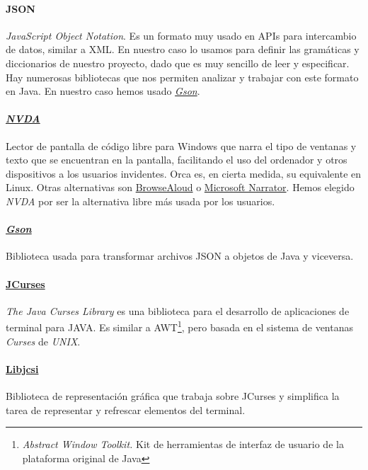 \paragraph{JSON} \textit{JavaScript Object Notation}. Es un formato muy usado en APIs para intercambio de datos, similar a XML. En nuestro caso lo usamos para definir las gramáticas y diccionarios de nuestro proyecto, dado que es muy sencillo de leer y especificar. Hay numerosas bibliotecas que nos permiten analizar y trabajar con este formato en Java. En nuestro caso hemos usado \href{https://goo.gl/zPCXen}{\textit{Gson}}.

\paragraph{\href{www.nvaccess.org}{\textit{NVDA}}} Lector de pantalla de código libre para Windows que narra el tipo de ventanas y texto que se encuentran en la pantalla, facilitando el uso del ordenador y otros dispositivos a los usuarios invidentes. 
Orca es, en cierta medida, su equivalente en Linux. Otras alternativas son \href{https://goo.gl/GoghW7}{BrowseAloud} o \href{http://goo.gl/OAB7VC}{Microsoft Narrator}. Hemos elegido \textit{NVDA} por ser la alternativa libre más usada por los usuarios.

\paragraph{\href{https://goo.gl/zPCXen}{\textit{Gson}}} Biblioteca usada para transformar archivos JSON a objetos de Java y viceversa.

\paragraph{\href{https://github.com/sunhong/jcurses}{JCurses}} \textit{The Java Curses Library} es una biblioteca para el desarrollo de aplicaciones de terminal para JAVA. Es similar a AWT\footnote{\textit{Abstract Window Toolkit.} Kit de herramientas de interfaz de usuario de la plataforma original de Java}, pero basada en el sistema de ventanas \textit{Curses} de \textit{UNIX}.

\paragraph{\href{www.slashie.net/libjcsi}{Libjcsi}} Biblioteca de representación gráfica que trabaja sobre JCurses y simplifica la tarea de representar y refrescar elementos del terminal.

